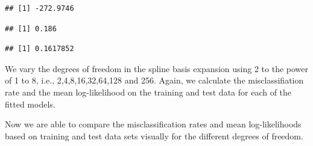 \documentclass[
]{article}
\begin{document}
\begin{verbatim}
## [1] -272.9746
\end{verbatim}

\begin{verbatim}
## [1] 0.186
\end{verbatim}

\begin{verbatim}
## [1] 0.1617852
\end{verbatim}

We vary the degrees of freedom in the spline basis expansion using 2 to
the power of 1 to 8, i.e., 2,4,8,16,32,64,128 and 256. Again, we
calculate the misclassifiation rate and the mean log-likelihood on the
training and test data for each of the fitted models.

Now we are able to compare the misclassification rates and mean
log-likelihoods based on training and test data sets visually for the
different degrees of freedom.
\end{document}
